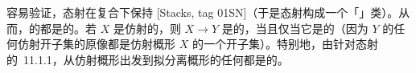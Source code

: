 容易验证，\trQuasiaffine{}态射在复合下保持 [Stacks, tag 01SN]（于是\trQuasiaffine{}态射构成一个「\trReasonable」类）。从而，\trQuasicompact{}的\trLocallyClosedEmbedding{}都是\trQuasiaffine{}的。若 $X$ 是仿射的，则 $X\to Y$ 是\trQuasiaffine{}的，当且仅当它是\trQuasicompact{}的（因为 $Y$ 的任何仿射开子集的原像都是仿射概形 $X$ 的一个开子集）。特别地，由针对\trQuasicompact{}态射的\trCancellationTheorem~11.1.1，从仿射概形出发到拟分离概形的任何\trMorphism{}都是\trQuasiaffine{}的。
